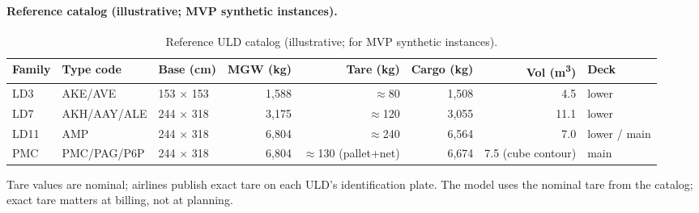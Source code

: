 \documentclass[11pt,a4paper]{article}
\theoremstyle{definition}
\begin{document}
\paragraph{Reference catalog (illustrative; MVP synthetic instances).}
\begin{table}[H]
\centering
\small
\caption{Reference ULD catalog (illustrative; for MVP synthetic instances).}
\label{tab:uld-reference}
\begin{tabular}{lllrrrrl}
\toprule
Family & Type code & Base (cm) & MGW (kg) & Tare (kg) & Cargo (kg) & Vol (m\textsuperscript{3}) & Deck \\
\midrule
LD3 & AKE/AVE & 153 $\times$ 153 & 1{,}588 & $\approx$80 & 1{,}508 & 4.5 & lower \\
LD7 & AKH/AAY/ALE & 244 $\times$ 318 & 3{,}175 & $\approx$120 & 3{,}055 & 11.1 & lower \\
LD11 & AMP & 244 $\times$ 318 & 6{,}804 & $\approx$240 & 6{,}564 & 7.0 & lower / main \\
PMC & PMC/PAG/P6P & 244 $\times$ 318 & 6{,}804 & $\approx$130 (pallet+net) & 6{,}674 & 7.5 (cube contour) & main \\
\bottomrule
\end{tabular}
\end{table}
Tare values are nominal; airlines publish exact tare on each ULD's
identification plate. The model uses the nominal tare from the catalog; exact
tare matters at billing, not at planning.
\end{document}
